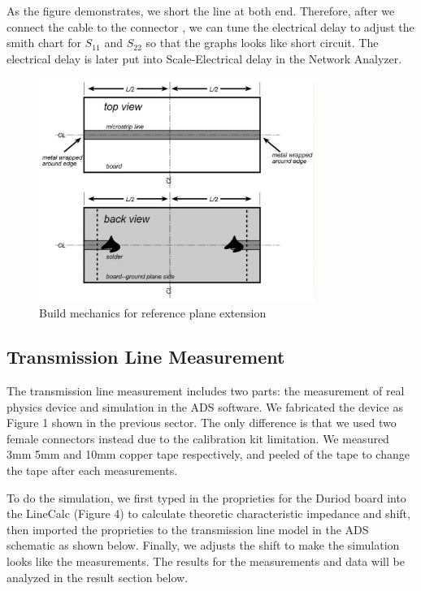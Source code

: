 \documentclass{article}
\begin{document}
\begin{flushleft}
As the figure demonstrates, we short the line at both end. Therefore, after we connect the cable to the connector , we can tune the electrical delay to adjust the smith chart for $S_{11}$ and $S_{22}$ so that the graphs looks like short circuit. The electrical delay is later put into Scale-Electrical delay in the Network Analyzer. 
\end{flushleft}


\begin{figure}[h]
    \centering
    \includegraphics[width = 0.8\textwidth]{figures/connector.jpg}
    \caption{Build mechanics for reference plane extension}
\end{figure}




\subsection{Transmission Line Measurement}


\begin{flushleft}
The transmission line measurement includes two parts: the measurement of real physics device and simulation in the ADS software. We fabricated the device as Figure 1 shown in the previous sector. The only difference is that we used two female connectors instead due to the calibration kit limitation. We measured 3mm 5mm and 10mm copper tape respectively, and peeled of the tape to change the tape after each measurements. 

\end{flushleft}

\begin{flushleft}
To do the simulation, we first typed in the proprieties for the Duriod board into the LineCalc (Figure 4) to calculate theoretic characteristic impedance and shift, then imported the proprieties to the transmission line model in the ADS schematic as shown below. Finally, we adjusts the shift to make the simulation looks like the measurements. The results for the measurements and data will be analyzed in the result section below.
\end{flushleft}
\end{document}
